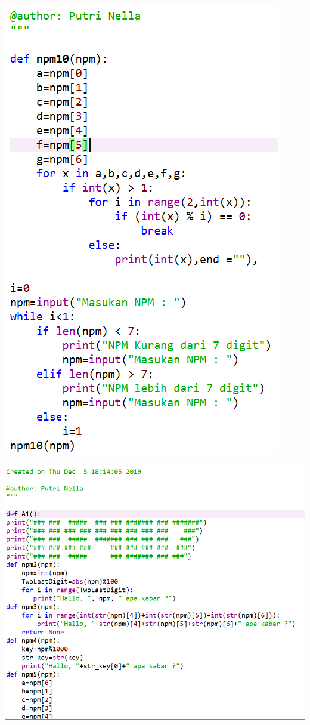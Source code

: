 \documentclass[a4paper, 12pt]{article}
\begin{document}
\begin{center}
\includegraphics[width=.8\textwidth]{figure/10.PNG}
\end{center}
\item
\begin{center}
\includegraphics[width=.8\textwidth]{figure/11aPNG.PNG}
\end{center}
\end{document}
